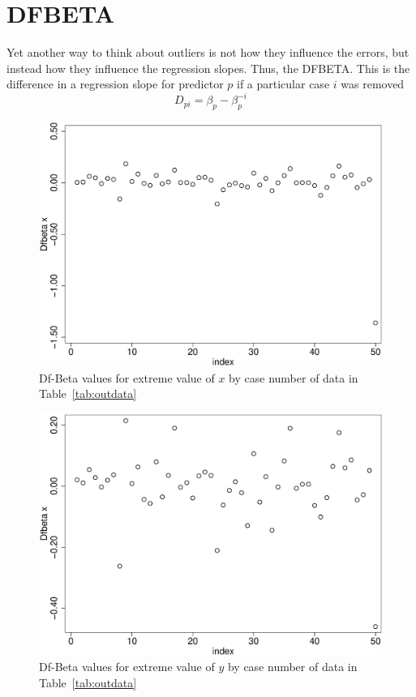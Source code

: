 \section{DFBETA}

Yet another way to think about outliers is not how they influence the errors, but instead how they influence the regression slopes.
Thus, the DFBETA. This is the difference in a regression slope for predictor $p$ if a particular case $i$ was removed
\begin{equation}
D_{pi}=\beta_p - \beta_p^{-i}
\end{equation}

\begin{figure}
   \centering
   \includegraphics[angle=0,
           width=.75\textwidth]{xout_dfb_index.eps}
   \caption{Df-Beta values for extreme value of $x$ by case number of data in Table~\ref{tab:outdata}}
  \label{fig:xdfb}
\end{figure}

\begin{figure}
   \centering
   \includegraphics[angle=0,
           width=.75\textwidth]{yout_dfb_index.eps}
   \caption{Df-Beta values for extreme value of $y$ by case number of data in Table~\ref{tab:outdata}}
  \label{fig:ydfb}
\end{figure}

